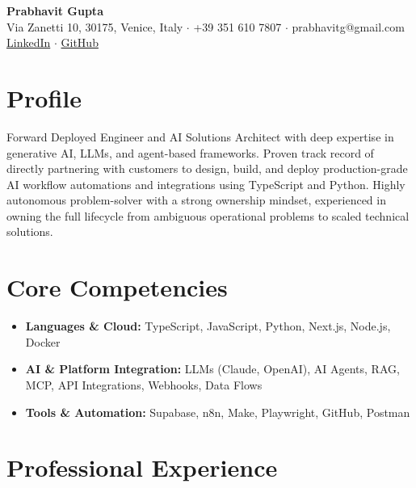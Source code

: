 \documentclass[11pt,a4paper]{article}
\begin{document}
\pagestyle{empty}

\begin{center}
    {\huge \textbf{Prabhavit Gupta}} \\ \vspace{0.5ex}
    Via Zanetti 10, 30175, Venice, Italy $\cdot$ +39 351 610 7807 $\cdot$ prabhavitg@gmail.com \\
    \href{https://www.linkedin.com/in/prabhavit/}{LinkedIn} $\cdot$ \href{https://github.com/prab-gupta}{GitHub}
\end{center}

\vspace{2ex}

\section*{Profile}
Forward Deployed Engineer and AI Solutions Architect with deep expertise in generative AI, LLMs, and agent-based frameworks. Proven track record of directly partnering with customers to design, build, and deploy production-grade AI workflow automations and integrations using TypeScript and Python. Highly autonomous problem-solver with a strong ownership mindset, experienced in owning the full lifecycle from ambiguous operational problems to scaled technical solutions.

\section*{Core Competencies}
\begin{itemize}[leftmargin=*,noitemsep]
    \item \textbf{Languages \& Cloud:} TypeScript, JavaScript, Python, Next.js, Node.js, Docker
    \item \textbf{AI \& Platform Integration:} LLMs (Claude, OpenAI), AI Agents, RAG, MCP, API Integrations, Webhooks, Data Flows
    \item \textbf{Tools \& Automation:} Supabase, n8n, Make, Playwright, GitHub, Postman
\end{itemize}

\section*{Professional Experience}
\end{document}
